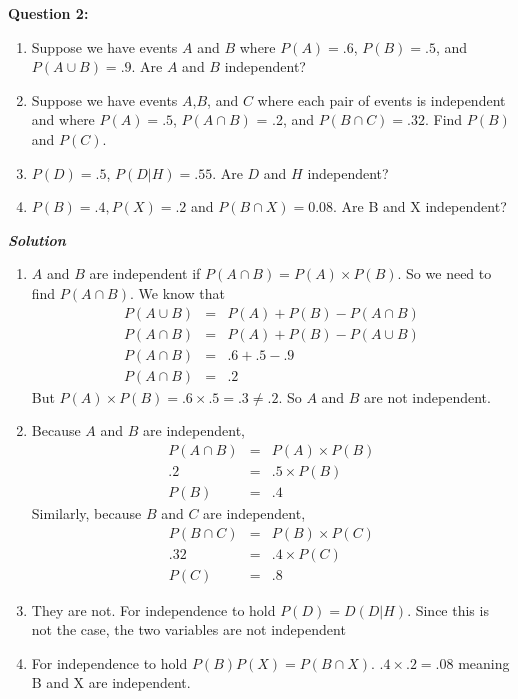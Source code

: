 \documentclass[10pt]{amsart}
\begin{document}
\noindent \textbf{Question 2:} 

\begin{enumerate}
\item Suppose we have events $A$ and $B$ where $P(A)=.6$, $P(B)=.5$, and $P(A \cup B)=.9$. Are $A$ and $B$ independent?
\item Suppose we have events $A$,$B$, and $C$ where each pair of events is independent and where $P(A) =.5$, $P(A \cap B)$ = .2, and $P(B \cap C) = .32$. Find $P(B)$ and $P(C)$.
\item $P(D) = .5$, $P(D|H) = .55$. Are $D$ and $H$ independent?
\item $P(B) = .4, P(X) = .2$ and $P(B \cap X) = 0.08$. Are B and X independent?
\end{enumerate}

\noindent \textit{\textbf{Solution}}
\medskip
\begin{enumerate}
\item $A$ and $B$ are independent if $P(A \cap B) = P(A) \times P(B)$. So we need to find $P(A \cap B)$. We know that 
\begin{eqnarray*}
P(A \cup B) &=& P(A) + P(B) - P(A \cap B) \\
P(A \cap B) &=& P(A) + P(B) - P(A \cup B) \\
P(A \cap B) &=& .6 + .5 - .9 \\
P(A \cap B) &=& .2
\end{eqnarray*}
But $P(A) \times P(B) = .6 \times .5 = .3 \neq .2$. So $A$ and $B$ are not independent.
\medskip
\item Because $A$ and $B$ are independent, 
\begin{eqnarray*}
P(A \cap B) &=& P(A) \times P(B) \\
.2 &=& .5 \times P(B) \\
P(B) &=& .4
\end{eqnarray*}
Similarly, because $B$ and $C$ are independent, 
\begin{eqnarray*}
P(B \cap C) &=& P(B) \times P(C) \\
.32 &=& .4 \times P(C) \\
P(C) &=& .8
\end{eqnarray*}

\item
They are not. For independence to hold $P(D) = D(D|H)$. Since this is not the case, the two variables are not independent

\item
For independence to hold $P(B)P(X) = P(B \cap X)$. $.4 \times .2 = .08$ meaning B and X are independent. 
\end{enumerate}
\end{document}
